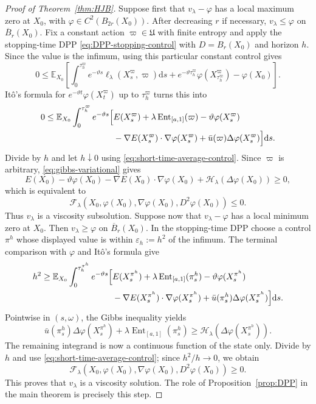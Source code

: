 \documentclass[10pt,a4paper]{amsart}
\def\E{\mathbb{E}}
\newcommand{\Ent}{\operatorname{Ent}}
\def\Fc{{\mathcal F}}
\newcommand{\dd}{\mathrm{d}}
\begin{document}
\begin{proof}[Proof of Theorem~\ref{thm:HJB}]
Suppose first that $v_\lambda-\varphi$ has a local maximum zero at $X_0$, with
$\varphi\in C^2(B_{2r}(X_0))$.  After decreasing $r$ if necessary,
$v_\lambda\le\varphi$ on $\overline B_r(X_0)$.  Fix a constant action
$\varpi\in\mathfrak U$ with finite entropy and apply the stopping-time DPP
\eqref{eq:DPP-stopping-control} with $D=B_r(X_0)$ and horizon $h$.  Since the value is the infimum,
using this particular constant control gives
\[
 0\le\E_{X_0}\left[
 \int_0^{\tau_h^\varpi}e^{-\vartheta s}
 \ell_\lambda(X_s^\varpi,\varpi)\dd s
 +e^{-\vartheta\tau_h^\varpi}\varphi(X_{\tau_h^\varpi}^\varpi)
 -\varphi(X_0)\right].
\]
It\^o's formula for $e^{-\vartheta t}\varphi(X_t^\varpi)$ up to
$\tau_h^\varpi$ turns this into
\begin{align*}
 0\le\E_{X_0}\int_0^{\tau_h^\varpi}e^{-\vartheta s}
 \Bigl[&E(X_s^\varpi)+\lambda\Ent_{[a,1]}(\varpi)
 -\vartheta\varphi(X_s^\varpi)\\
 &-\nabla E(X_s^\varpi)\cdot\nabla\varphi(X_s^\varpi)
 +\bar u(\varpi)\Delta\varphi(X_s^\varpi)\Bigr]\dd s.
\end{align*}
Divide by $h$ and let $h\downarrow0$ using
\eqref{eq:short-time-average-control}.  Since $\varpi$ is arbitrary,
\eqref{eq:gibbs-variational} gives
\[
 E(X_0)-\vartheta\varphi(X_0)
 -\nabla E(X_0)\cdot\nabla\varphi(X_0)
 +\mathscr H_\lambda(\Delta\varphi(X_0))\ge0,
\]
which is equivalent to
\[
 \Fc_\lambda(X_0,\varphi(X_0),\nabla\varphi(X_0),D^2\varphi(X_0))\le0.
\]
Thus $v_\lambda$ is a viscosity subsolution.
Suppose now that $v_\lambda-\varphi$ has a local minimum zero at $X_0$.  Then
$v_\lambda\ge\varphi$ on $\overline B_r(X_0)$.  In the stopping-time DPP choose a control
$\pi^h$ whose displayed value is within $\varepsilon_h:=h^2$ of the infimum.  The terminal
comparison with $\varphi$ and It\^o's formula give
\begin{align*}
 h^2\ge\E_{X_0}\int_0^{\tau_h^{\pi^h}}e^{-\vartheta s}
 \Bigl[&E(X_s^{\pi^h})+\lambda\Ent_{[a,1]}(\pi_s^h)
 -\vartheta\varphi(X_s^{\pi^h})\\
 &-\nabla E(X_s^{\pi^h})\cdot\nabla\varphi(X_s^{\pi^h})
 +\bar u(\pi_s^h)\Delta\varphi(X_s^{\pi^h})\Bigr]\dd s.
\end{align*}
Pointwise in $(s,\omega)$, the Gibbs inequality yields
\[
 \bar u(\pi_s^h)\Delta\varphi(X_s^{\pi^h})
 +\lambda\Ent_{[a,1]}(\pi_s^h)
 \ge\mathscr H_\lambda(\Delta\varphi(X_s^{\pi^h})).
\]
The remaining integrand is now a continuous function of the state only.  Divide by $h$ and use
\eqref{eq:short-time-average-control}; since $h^2/h\to0$, we obtain
\[
 \Fc_\lambda(X_0,\varphi(X_0),\nabla\varphi(X_0),D^2\varphi(X_0))\ge0.
\]
This proves that $v_\lambda$ is a viscosity solution.  The role of
Proposition~\ref{prop:DPP} in the main theorem is precisely this step.


\end{proof}
\end{document}
